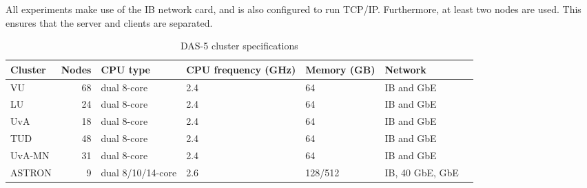 All experiments make use of the IB network card, and is also configured to run TCP/IP.
Furthermore, at least two nodes are used.
This ensures that the server and clients are separated.

\begin{table}
    \centering
    \begin{tabular}{lrlllll}
        \toprule
        \textbf{Cluster} & \textbf{Nodes} & \textbf{CPU type} & \textbf{CPU frequency (GHz)} & \textbf{Memory (GB)} & \textbf{Network} \\
        \midrule
        VU & 68 & dual 8-core & 2.4 & 64 & IB and GbE \\
        LU & 24 & dual 8-core & 2.4 & 64 & IB and GbE \\
        UvA & 18 & dual 8-core & 2.4 & 64 & IB and GbE \\
        TUD & 48 & dual 8-core & 2.4 & 64 & IB and GbE \\
        UvA-MN & 31 & dual 8-core & 2.4 & 64 & IB and GbE \\
        ASTRON & 9 & dual 8/10/14-core & 2.6 & 128/512 & IB, 40 GbE, GbE \\
        \bottomrule
    \end{tabular}
    \caption{DAS-5 cluster specifications}
    \label{tab:das5}
\end{table}






